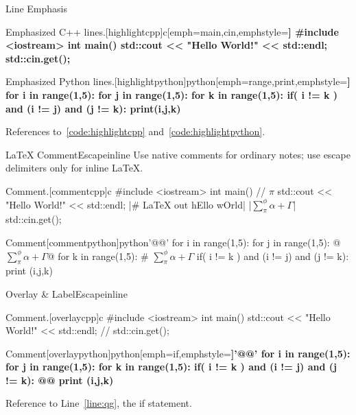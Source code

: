 \documentclass[hyperref, UTF8, CJK, aspectratio=169]{beamer}
\begin{document}
\begin{frame}[fragile]{Line Emphasis}
	\begin{bitcode}{Emphasized C++ lines.}[highlightcpp]{c}[emph={main,cin},emphstyle=\color{PrimaryC}\bfseries]
		#include <iostream>
		int main()
		{
			std::cout << "Hello World!" << std::endl;
			std::cin.get();
		}
	\end{bitcode}
	\begin{bitcode}{Emphasized Python lines.}[highlightpython]{python}[emph={range,print},emphstyle=\color{PrimaryC}\bfseries]
		for i in range(1,5):
			for j in range(1,5):
				for k in range(1,5):
					if( i != k ) and (i != j) and (j != k):
						print(i,j,k)
	\end{bitcode}
	References to~\cref{code:highlightcpp} and~\cref{code:highlightpython}.
\end{frame}

\begin{frame}[fragile]{\LaTeX{} Comment}{Escapeinline}
	{\footnotesize Use native comments for ordinary notes; use escape delimiters only for inline \LaTeX{}.}
	\vspace{-.5ex}
	\begin{bitcode}{Comment.}[commentcpp]{c}
		#include <iostream>
		int main()
		{// $\pi$
			std::cout << "Hello World!" << std::endl; |\# \textsf{\LaTeX{} out hEllo wOrld}|
			|\colorbox{bitc!60}{$\sum_\pi^\phi \alpha + \Gamma$}| std::cin.get(); 
		}
	\end{bitcode}
	\begin{bitcode}{Comment}[commentpython]{python}'@@'
		for i in range(1,5):
			for j in range(1,5): @$\sum_\pi^\phi \alpha + \Gamma$@
				for k in range(1,5): # $\sum_\pi^\phi \alpha + \Gamma$
					if( i != k ) and (i != j) and (j != k):
						print (i,j,k)
	\end{bitcode}
\end{frame}

\begin{frame}[fragile]{Overlay \& Label}{Escapeinline}
	\begin{bitcode}{Comment.}[overlaycpp]{c}
		#include <iostream>
		int main()
		{
			std::cout << "Hello World!" << std::endl; // \only<2>{Value 2}
			std::cin.get();
		}
	\end{bitcode}
	\begin{bitcode}{Comment}[overlaypython]{python}[emph={if},emphstyle=\color{PrimaryC}\bfseries]'@@'
		for i in range(1,5):
			for j in range(1,5): 
				for k in range(1,5):
					if( i != k ) and (i != j) and (j != k): @\label{line:qg}@
						print (i,j,k)
	\end{bitcode}
  Reference to Line~\ref{line:qg}, the if statement.
\end{frame}
\end{document}
